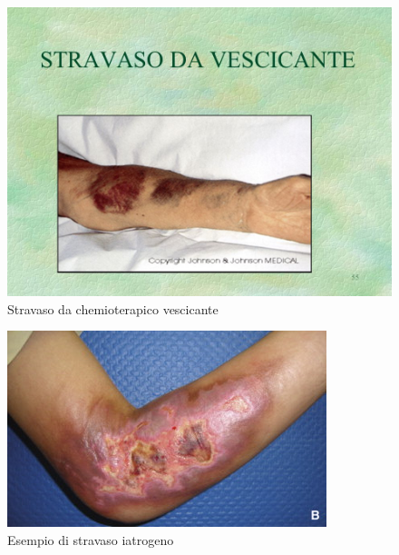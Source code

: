 \begin{figure}[H]
    \begin{center}
    \includegraphics[width=0.4\columnwidth]{img/STRAVASOVESC.jpeg}
    \vspace{-3mm}
    \end{center}
    \caption{Stravaso da chemioterapico vescicante
    \cite{STRAVASONURSE}}
    \label{fig:FIGURE_4.20}
\end{figure}

\begin{figure}[H]
    \begin{center}
    \includegraphics[width=0.4\columnwidth]{img/STRAVASOIATROGENO.jpg}
    \vspace{-3mm}
    \end{center}
    \caption{Esempio di stravaso iatrogeno
    \cite{Iatrogeno}}
    \label{fig:FIGURE_4.21}
\end{figure}

